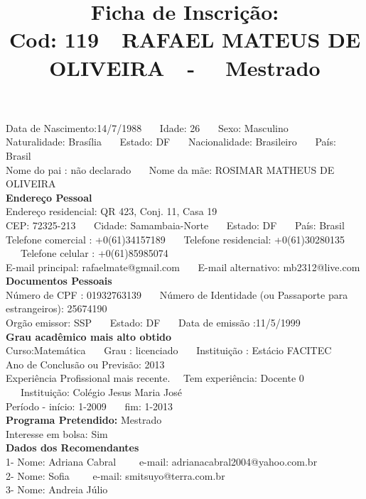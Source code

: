 \documentclass[11pt]{article}
\title{\vspace*{-4cm} Ficha de Inscrição: \\Cod: 119\ \ RAFAEL MATEUS DE OLIVEIRA\ \ - \ \ Mestrado 
 }
\date{}
\begin{document}
\maketitle
\vspace*{-1.5cm}
\noindent Data de Nascimento:14/7/1988
\ \ \ Idade: 26   \ \ \ Sexo: Masculino
\\
Naturalidade: Brasília  
\ \ \  Estado: DF
\ \ \  Nacionalidade: Brasileiro
\ \ \ País: Brasil
\\        
Nome do pai : não declarado
\ \ \ Nome da mãe: ROSIMAR MATHEUS DE OLIVEIRA          
\\[0.2cm]                     
\textbf{Endereço Pessoal} 
\\ 
\noindent Endereço residencial: QR 423, Conj. 11, Casa 19
\\
        CEP: 72325-213  
\ \ \ Cidade: Samambaia-Norte 
\ \ \ Estado: DF 
\ \ \ País: Brasil
\\		
		Telefone comercial : +0(61)34157189
\ \ \ Telefone residencial: +0(61)30280135
\ \ \ Telefone celular : +0(61)85985074
\\
E-mail principal: rafaelmate@gmail.com
\ \ \ E-mail alternativo: mb2312@live.com 
\\[0.2cm] 
\textbf{Documentos Pessoais}
\\
\noindent Número de CPF : 01932763139
\ \ \ Número de Identidade (ou Passaporte para estrangeiros): 25674190
\\
Orgão emissor: SSP
\ \ \ Estado: DF
\ \ \ Data de emissão :11/5/1999
\\[0.3cm]
\textbf{Grau acadêmico mais alto obtido}
\\	
Curso:Matemática
\ \ \ Grau : licenciado
\ \ \ Instituição : Estácio FACITEC
\\			
Ano de Conclusão ou Previsão: 2013
\\ 
Experiência Profissional mais recente. \ \  
Tem experiência: Docente 0  
\ \ \ Instituição: Colégio Jesus Maria José
\\  
Período - início: 1-2009
\ \ \ fim: 1-2013
\\[0.2cm] 
\textbf{Programa Pretendido:} Mestrado\\
Interesse em bolsa: Sim
\\[0.3cm]		
\textbf{Dados dos Recomendantes} 
\\
1- Nome: Adriana Cabral
\ \ \ \  e-mail: adrianacabral2004@yahoo.com.br 
\\
2- Nome: Sofia
\ \ \ \ e-mail: smitsuyo@terra.com.br
\\
3- Nome: Andreia Júlio
\end{document}
